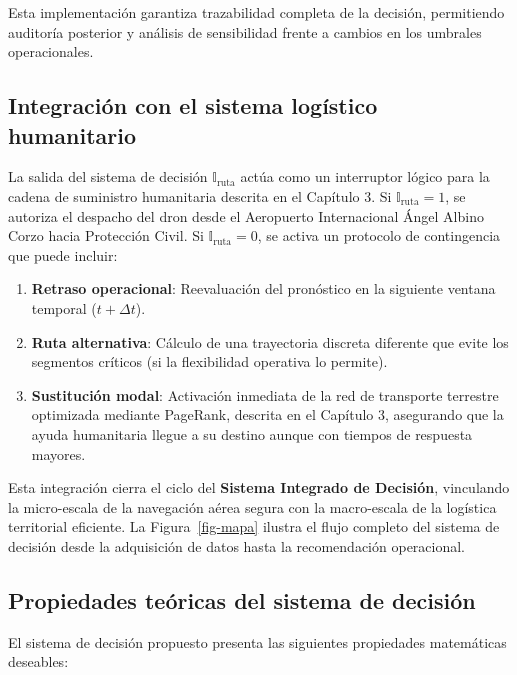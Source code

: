 \documentclass[
  spanish,
  us-letterpaper,
]{scrreprt}
\providecommand{\tightlist}{%
  \setlength{\itemsep}{0pt}\setlength{\parskip}{0pt}}
\numberwithin{equation}{section}
\begin{document}
Esta implementación garantiza trazabilidad completa de la decisión,
permitiendo auditoría posterior y análisis de sensibilidad frente a
cambios en los umbrales operacionales.

\subsection{Integración con el sistema logístico
humanitario}\label{integraciuxf3n-con-el-sistema-loguxedstico-humanitario}

La salida del sistema de decisión \(\mathbb{I}_{\text{ruta}}\) actúa
como un interruptor lógico para la cadena de suministro humanitaria
descrita en el Capítulo 3. Si \(\mathbb{I}_{\text{ruta}} = 1\), se
autoriza el despacho del dron desde el Aeropuerto Internacional Ángel
Albino Corzo hacia Protección Civil. Si
\(\mathbb{I}_{\text{ruta}} = 0\), se activa un protocolo de contingencia
que puede incluir:

\begin{enumerate}
\def\labelenumi{\arabic{enumi}.}
\tightlist
\item
  \textbf{Retraso operacional}: Reevaluación del pronóstico en la
  siguiente ventana temporal (\(t + \Delta t\)).
\item
  \textbf{Ruta alternativa}: Cálculo de una trayectoria discreta
  diferente que evite los segmentos críticos (si la flexibilidad
  operativa lo permite).
\item
  \textbf{Sustitución modal}: Activación inmediata de la red de
  transporte terrestre optimizada mediante PageRank, descrita en el
  Capítulo 3, asegurando que la ayuda humanitaria llegue a su destino
  aunque con tiempos de respuesta mayores.
\end{enumerate}

Esta integración cierra el ciclo del \textbf{Sistema Integrado de
Decisión}, vinculando la micro-escala de la navegación aérea segura con
la macro-escala de la logística territorial eficiente. La
Figura~\ref{fig-mapa} ilustra el flujo completo del sistema de decisión
desde la adquisición de datos hasta la recomendación operacional.

\subsection{Propiedades teóricas del sistema de
decisión}\label{propiedades-teuxf3ricas-del-sistema-de-decisiuxf3n}

El sistema de decisión propuesto presenta las siguientes propiedades
matemáticas deseables:
\end{document}
